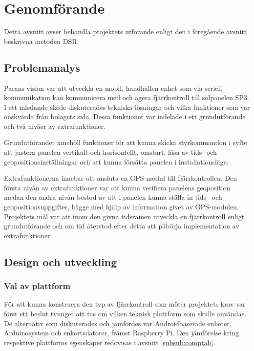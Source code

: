 \documentclass{article}
\begin{document}
    \newpage

    \section{Genomförande} %
    \label{sec:genomforande}
        Detta avsnitt avser behandla projektets utförande enligt den i föregående avsnitt be\-skrivna metoden DSR.
        
        \subsection{Problemanalys} %
        \label{sub:problemanalys}
            Parans vision var att utveckla en mobil, handhållen enhet som via seriell kommunikation kan kommunicera med och agera fjärrkontroll till solpanelen SP3.  I ett inledande \hbox{skede} diskuterades tekniska lösningar och vilka funktioner som var önskvärda från bolagets sida. Dessa funktioner var indelade i ett grundutförande och två nivåer av extrafunktioner. \bigskip
            
            \noindent Grundutförandet innehöll funktioner för att kunna skicka styrkommandon i syfte att justera panelen vertikalt och horisontellt, omstart, läsa av tids- och geopositionsinställningar och att kunna försätta panelen i installationsläge. \bigskip
            
            \noindent Extrafunktionerna innebar att ansluta en GPS-modul till fjärrkontrollen. Den första nivån av extrafunktioner var att kunna verifiera panelens geoposition medan den andra nivån bestod av att i panelen kunna ställa in tids-- och geopositionsuppgifter, bägge med hjälp av information givet av GPS-modulen. Projektets mål var att inom den givna tidsramen utveckla en fjärrkontroll enligt grundutförande och om tid återstod efter detta att påbörja implementation av extrafunktioner.

        \subsection{Design och utveckling} %
        \label{sub:design_och_utveckling}
        
            \subsubsection{Val av plattform} %
            \label{subsub:val_av_plattform}
            För att kunna konstruera den typ av fjärrkontroll som möter projektets krav var först ett beslut tvunget att tas om vilken teknisk plattform som skulle användas. De alternativ som diskuterades och jämfördes var Androidbaserade enheter, Arduinosystem och enkortsdatorer, främst Raspberry Pi. Den jämförelse kring respektive plattforms egenskaper redovisas i avsnitt \ref{subsub:comptab}.\bigskip
\end{document}
